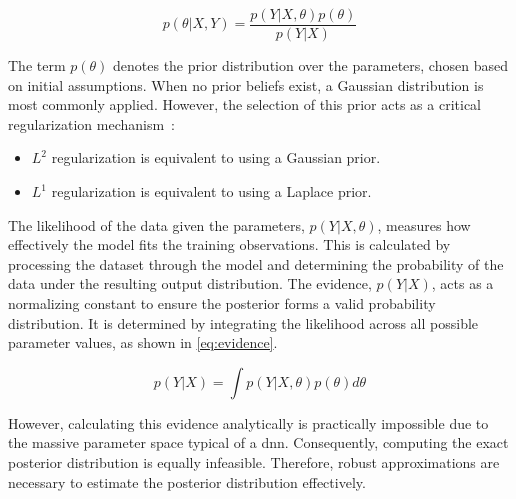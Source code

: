 \begin{equation}
    p(\theta|X, Y) = \frac{p(Y|X, \theta)p(\theta)}{p(Y|X)}
    \label{eq:posterior-distr}
\end{equation}

The term $p(\theta)$ denotes the prior distribution over the parameters, chosen based on initial assumptions.
When no prior beliefs exist, a Gaussian distribution is most commonly applied.
However, the selection of this prior acts as a critical regularization mechanism~\cite{src:lecture-notes-bayesian-learning}:

\begin{itemize}
    \item $L^2$ regularization is equivalent to using a Gaussian prior.
    \item $L^1$ regularization is equivalent to using a Laplace prior.
\end{itemize}

The likelihood of the data given the parameters, $p(Y|X, \theta)$, measures how effectively the model fits the training observations.
This is calculated by processing the dataset through the model and determining the probability of the data under the resulting output distribution.
The evidence, $p(Y|X)$, acts as a normalizing constant to ensure the posterior forms a valid probability distribution.
It is determined by integrating the likelihood across all possible parameter values, as shown in \cref{eq:evidence}.

\begin{equation}
    p(Y|X) = \int p(Y|X, \theta)p(\theta)d\theta
    \label{eq:evidence}
\end{equation}

However, calculating this evidence analytically is practically impossible due to the massive parameter space typical of a \gls{dnn}.
Consequently, computing the exact posterior distribution is equally infeasible.
Therefore, robust approximations are necessary to estimate the posterior distribution effectively.

